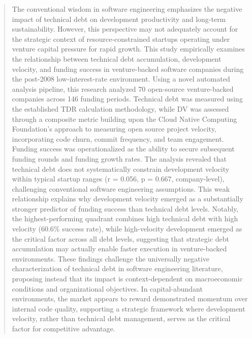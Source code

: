 \begin{abstract}
The conventional wisdom in software engineering emphasizes the negative impact of technical debt on development productivity and long-term sustainability. However, this perspective may not adequately account for the strategic context of resource-constrained startups operating under venture capital pressure for rapid growth. This study empirically examines the relationship between technical debt accumulation, development velocity, and funding success in venture-backed software companies during the post-2008 low-interest-rate environment.
Using a novel automated analysis pipeline, this research analyzed 70 open-source venture-backed companies across 146 funding periods. Technical debt was measured using the established \ac{TDR} calculation methodology, while \ac{DV} was assessed through a composite metric building upon the Cloud Native Computing Foundation's approach to measuring open source project velocity, incorporating code churn, commit frequency, and team engagement. Funding success was operationalized as the ability to secure subsequent funding rounds and funding growth rates.
The analysis revealed that technical debt does not systematically constrain development velocity within typical startup ranges (r = 0.056, p = 0.667, company-level), challenging conventional software engineering assumptions. This weak relationship explains why development velocity emerged as a substantially stronger predictor of funding success than technical debt levels. Notably, the highest-performing quadrant combines high technical debt with high velocity (60.6\% success rate), while high-velocity development emerged as the critical factor across all debt levels, suggesting that strategic debt accumulation may actually enable faster execution in venture-backed environments.
These findings challenge the universally negative characterization of technical debt in software engineering literature, proposing instead that its impact is context-dependent on macroeconomic conditions and organizational objectives. In capital-abundant environments, the market appears to reward demonstrated momentum over internal code quality, supporting a strategic framework where development velocity, rather than technical debt management, serves as the critical factor for competitive advantage.
\end{abstract}